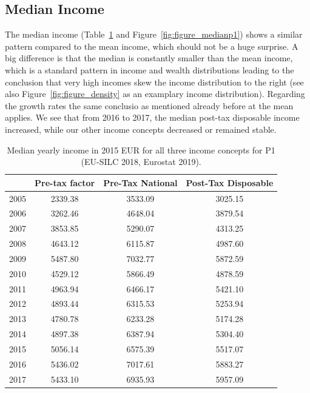 \documentclass[a4paper]{article}\usepackage[]{graphicx}\usepackage[]{color}
\begin{document}
\subsection{Median Income}
The median income (Table~\ref{median_p1} and Figure~\ref{fig:figure_medianp1}) shows a similar pattern compared to the mean income, which should not be a huge surprise. A big difference is that the median is constantly smaller than the mean income, which is a standard pattern in income and wealth distributions leading to the conclusion that very high incomes skew the income distribution to the right (see also Figure~\ref{fig:figure_density} as an examplary income distribution). Regarding the growth rates the same conclusio as mentioned already before at the mean applies.
We see that from 2016 to 2017, the median post-tax disposable income increased, while our other income concepts decreased or remained stable. 
\begin{table}[ht]
\centering
\begin{tabular}{lccc}
  \toprule
 & Pre-tax factor & Pre-Tax National & Post-Tax Disposable \\ 
  \midrule
2005 & 2339.38 & 3533.09 & 3025.15 \\ 
  2006 & 3262.46 & 4648.04 & 3879.54 \\ 
  2007 & 3853.85 & 5290.07 & 4313.25 \\ 
  2008 & 4643.12 & 6115.87 & 4987.60 \\ 
  2009 & 5487.80 & 7032.77 & 5872.59 \\ 
  2010 & 4529.12 & 5866.49 & 4878.59 \\ 
  2011 & 4963.94 & 6466.17 & 5421.10 \\ 
  2012 & 4893.44 & 6315.53 & 5253.94 \\ 
  2013 & 4780.78 & 6233.28 & 5174.28 \\ 
  2014 & 4897.38 & 6387.94 & 5304.40 \\ 
  2015 & 5056.14 & 6575.39 & 5517.07 \\ 
  2016 & 5436.02 & 7017.61 & 5883.27 \\ 
  2017 & 5433.10 & 6935.93 & 5957.09 \\ 
   \bottomrule
\end{tabular}
\caption{Median yearly income in 2015 EUR for all three income concepts for P1 (EU-SILC 2018, Eurostat 2019).} 
\label{median_p1}
\end{table}
\end{document}
